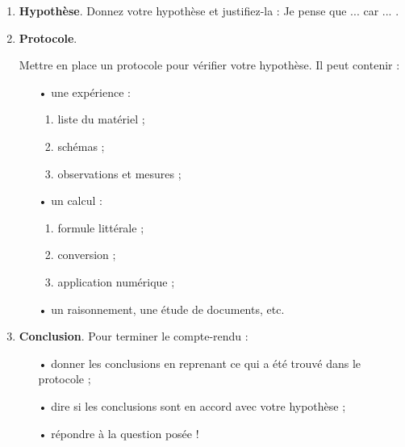 \documentclass[12pt,a4paper,fleqn]{article}
\begin{document}
\begin{enumerate}
\item \textbf{Hypothèse}. Donnez votre hypothèse et justifiez-la : \og Je pense que ... car ... \fg{}. \hfill \anarai{}

\item \textbf{Protocole}. \hfill \app{} \anarai{} \rea{}

Mettre en place un protocole pour vérifier votre hypothèse. Il peut contenir :
\vspace{-0.5\baselineskip}
\begin{multicols}{2}
\begin{itemize}
\item[•] une expérience :
\begin{enumerate}
\item liste du matériel ;
\item schémas ;
\item observations et mesures ;
\end{enumerate}
\item[•] un calcul :
\begin{enumerate}
\item formule littérale ;
\item conversion ;
\item application numérique ;
\end{enumerate}
\end{itemize}
\end{multicols}
\vspace{-1.\baselineskip}
\begin{itemize}
\item[•] un raisonnement, une étude de documents, etc.
\end{itemize}
\item \textbf{Conclusion}. Pour terminer le compte-rendu : \hfill \val{}
\begin{itemize}
\item[•] donner les conclusions en reprenant ce qui a été trouvé dans le protocole ;
\item[•] dire si les conclusions sont en accord avec votre hypothèse ;
\item[•] répondre à la question posée !
\end{itemize}
\end{enumerate}
\end{document}
